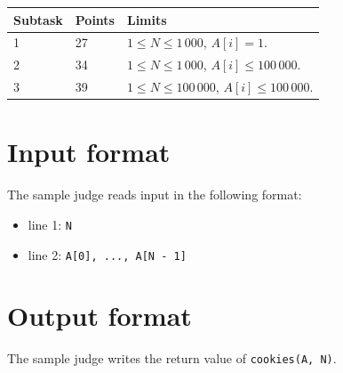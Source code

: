 \begin{tabular}{|l|l|l|}
  \hline
  \textbf{Subtask} & \textbf{Points} & \textbf{Limits} \\ \hline
  1 & 27 & $1 \le N \le 1\,000$,  $A[i] = 1$. \\ \hline
  2 & 34 & $1 \le N \le 1\,000$,  $A[i] \le 100\,000$. \\ \hline
  3 & 39 & $1 \le N \le 100\,000$,  $A[i] \le 100\,000$. \\ \hline
\end{tabular}

\section*{Input format}
The sample judge reads input in the following format:

\begin{itemize}
  \item line 1: \texttt{N}
  \item line 2: \texttt{A[0], ..., A[N - 1]}
\end{itemize}

\section*{Output format}
The sample judge writes the return value of \texttt{cookies(A, N)}.
